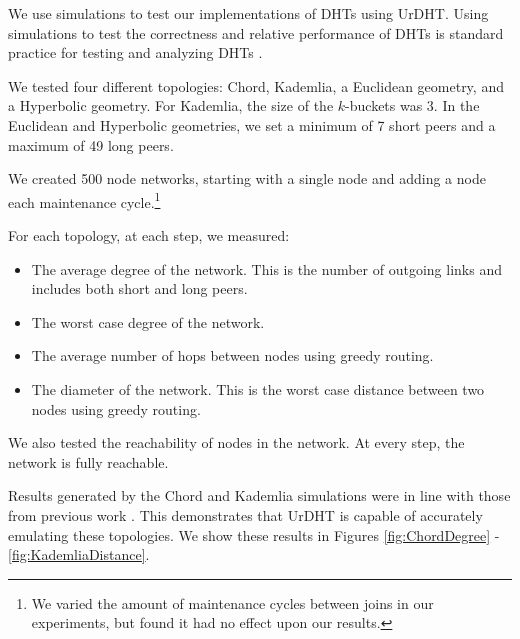 We use simulations to test our implementations of DHTs using UrDHT.
Using simulations to test the correctness and relative performance of DHTs is standard practice for testing and analyzing DHTs \cite{kademlia} \cite{symphony} \cite{chord}  \cite{tapestry}  \cite{raynet} \cite{li2005comparing}.

%
%
%
%

We tested four different topologies: Chord, Kademlia, a Euclidean geometry, and a Hyperbolic geometry.
For Kademlia, the size of the $k$-buckets was 3.
In the Euclidean and Hyperbolic geometries, we set a minimum of 7 short peers and a maximum of 49 long peers.

We created 500 node networks, starting with a single node and adding a node each maintenance cycle.\footnote{We varied the amount of maintenance cycles between joins in our experiments, but found it had no effect upon our results.}

For each topology, at each step, we measured:
\begin{itemize}
	\item The average degree of the network.  This is the  number of outgoing links and includes both short and long peers.
	\item The worst case degree of the network.
	\item The average number of hops between nodes using greedy routing.
	\item The diameter of the network.  
	This is the worst case distance between two nodes using greedy routing.
\end{itemize}

We also tested the reachability of nodes in the network.
At every step, the network is fully reachable.

Results generated by the Chord and Kademlia simulations were in line with those from previous work  \cite{kademlia} \cite{chord}.
This demonstrates that UrDHT is capable of accurately emulating these topologies.
We show these results in Figures \ref{fig:ChordDegree} - \ref{fig:KademliaDistance}.



